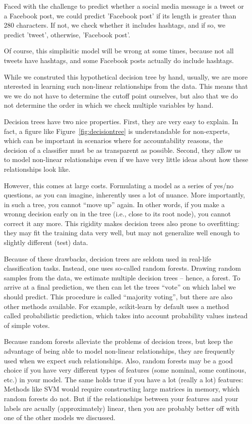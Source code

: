 Faced with the challenge to predict whether a social media message is
a tweet or a Facebook post, we could predict 'Facebook post' if its
length is greater than 280 characters. If not, we check whether it
includes hashtags, and if so, we predict 'tweet', otherwise, 'Facebook
post'.

Of course, this simplisitic model will be wrong at some times, because
not all tweets have hashtags, and some Facebook posts actually do
include hashtags.

While we construted this hypothetical decision tree by hand, usually,
we are more nterested in learning such non-linear relationships from
the data.  This means that we we do not have to determine the cutoff
point ourselves, but also that we do not determine the order in which
we check multiple variables by hand.

Decision trees have two nice properties. First, they are very easy to
explain.  In fact, a figure like Figure~\ref{fig:decisiontree} is
understandable for non-experts, which can be important in scenarios
where for accountability reasons, the decision of a classifier must be
as transparent as possible.  Second, they allow us to model non-linear
relationships even if we have very little ideas about how these
relationships look like.

However, this comes at large costs.  Formulating a model as a series
of yes/no questions, as you can imagine, inherently uses a lot of
nuance. More importantly, in such a tree, you cannot ``move up''
again. In other words, if you make a wronng decision early on in the
tree (i.e., close to its root node), you cannot correct it any more.
This rigidity makes decision trees also prone to overfitting: they may
fit the training data very well, but may not generalize well enough to
slightly different (test) data.

Because of these drawbacks, decision trees are seldom used in
real-life classification tasks.  Instead, one uses so-called random
forests.  Drawing random samples from the data, we estimate multiple
decision trees -- hence, a forest.  To arrive at a final prediction,
we then can let the trees ``vote'' on which label we should
predict. This procedure is called ``majority voting'', but there are
also other methods available. For example, scikit-learn by default
uses a method called probabilistic prediction, which takes into
account probability values instead of simple votes.

Because random forests alleviate the problems of decision trees, but
keep the advantage of being able to model non-linear relationships,
they are frequently used when we expect such relationships.  Also,
random forests may be a good choice if you have very different types
of features (some nominal, some continous, etc.) in your model. The
same holds true if you have a lot (really a lot) features: Methods
like SVM would require constructing large matrices in memory, which
random forests do not.  But if the relationships between your features
and your labels are acually (approximately) linear, then you are
probably better off with one of the other models we discussed.

